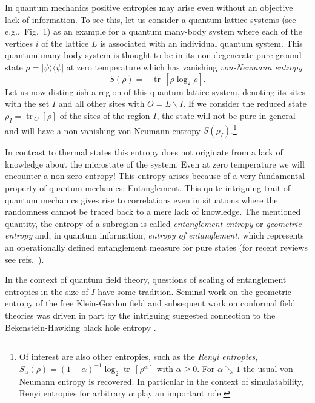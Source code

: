 \documentclass[rmp,floatfix,12pt]{revtex4} %
\DeclareMathOperator{\tr}{tr\,}
\begin{document}
In quantum mechanics positive entropies may arise even without an 
objective lack of information. To see this, let us consider a 
quantum lattice systems (see e.g.,\ Fig.\ 1) as an example for a 
quantum many-body system where each of the vertices $i$ of 
the lattice $L$ is associated with an individual quantum system. 
This quantum many-body system is thought to be in its non-degenerate 
pure ground state $\rho=|\psi\rangle\langle\psi|$ at zero temperature
which has vanishing {\it von-Neumann entropy} 
\begin{equation*}
        S(\rho) = - \tr[\rho \log_2 \rho].
\end{equation*}
Let us now distinguish a region of this quantum lattice 
system, denoting its sites with the set $I$ and all other 
sites with $O=L\backslash I$. If we consider the reduced state 
$\rho_I= \tr_{O}[\rho]$ of the sites of the region $I$, 
the state will not be pure in general and will have a 
non-vanishing von-Neumann entropy $S(\rho_I)$.\footnote{Of interest are also other entropies, such as the 
{\it Renyi entropies}, $S_\alpha(\rho) =(1-\alpha)^{-1} 
\log_2 \tr [\rho^\alpha]$ with $\alpha\geq 0$. For 
$\alpha\searrow 1$ the usual von-Neumann entropy is recovered. 
In particular in the context of simulatability, Renyi entropies 
for arbitrary $\alpha$ play an important role.}

In contrast to thermal states this entropy does not originate 
from a lack of knowledge about the microstate of the system. 
Even at zero temperature we will encounter a non-zero 
entropy! This entropy arises because of a very fundamental property 
of quantum mechanics: Entanglement. This quite intriguing 
trait of quantum mechanics gives rise to correlations even
in situations where the randomness cannot be traced back 
to a mere lack of knowledge. The mentioned quantity, the entropy 
of a subregion is called {\it entanglement entropy} or  
{\it geometric entropy} and, in quantum information,
{\it entropy of entanglement}, which 
 represents an operationally defined entanglement 
measure for pure states (for recent reviews see refs.\ \cite{Horodecki,InHouseReview}).

In the context of quantum field theory, questions of scaling
of entanglement entropies  in the size of $I$ have some tradition. Seminal work on the 
geometric entropy of the free Klein-Gordon field 
\cite{Bombelli,Srednicki} and subsequent work on conformal field
theories \cite{Larsen,Callan,PreskillOld,Calabrese,HardStuff} was 
driven in part by the intriguing suggested connection to the 
Bekenstein-Hawking black hole entropy 
\cite{Bekenstein,Hawking74,BekensteinCP}. 
\end{document}
